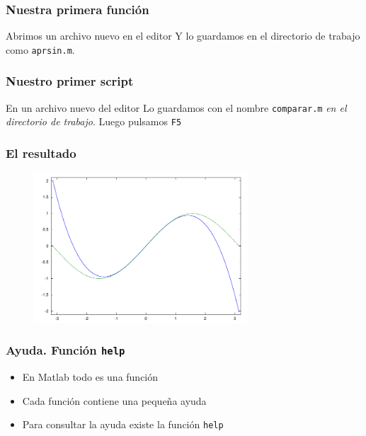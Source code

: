 \documentclass[12pt]{beamer}
\begin{document}
\begin{large}
\begin{frame}
  \frametitle{Nuestra primera función}
Abrimos un archivo nuevo en el editor
\testcode
Y lo guardamos en el directorio de trabajo como \texttt{aprsin.m}.
\end{frame}


\begin{frame}
\frametitle{Nuestro primer script}
En un archivo nuevo del editor
\testcode
Lo guardamos con el nombre \texttt{comparar.m} \emph{en el directorio
  de trabajo}. Luego pulsamos \texttt{F5}
\end{frame}

\begin{frame}
\frametitle{El resultado}
  \begin{figure}[h]
    \centering{}
    \includegraphics[width=8cm, keepaspectratio]{fig/comparar.pdf}
  \end{figure}
\end{frame}



\begin{frame}
\frametitle{Ayuda. Función \texttt{help}}
\begin{itemize}
\item En Matlab todo es una función
\item Cada función contiene una pequeña ayuda
\item Para consultar la ayuda existe la función \texttt{help}
\end{itemize}
\testcode
\end{frame}


\end{large}
\end{document}
